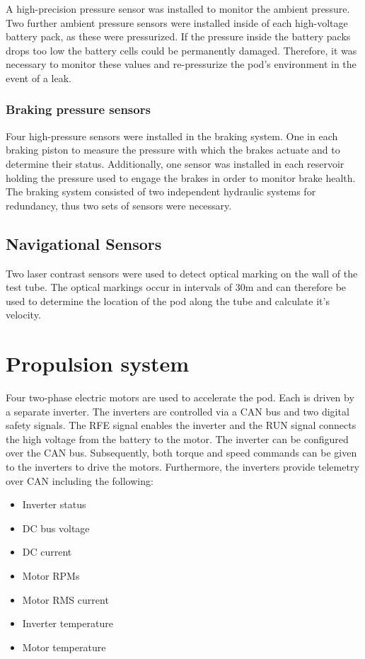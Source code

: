 A high-precision pressure sensor was installed to monitor the ambient pressure. Two further ambient pressure sensors were installed inside of each high-voltage battery pack, as these were pressurized. If the pressure inside the battery packs drops too low the battery cells could be permanently damaged. Therefore, it was necessary to monitor these values and re-pressurize the pod's environment in the event of a leak.

\subsubsection{Braking pressure sensors}

Four high-pressure sensors were installed in the braking system. One in each braking piston to measure the pressure with which the brakes actuate and to determine their status. Additionally, one sensor was installed in each reservoir holding the pressure used to engage the brakes in order to monitor brake health. The braking system consisted of two independent hydraulic systems for redundancy, thus two sets of sensors were necessary.

\subsection{Navigational Sensors}

Two laser contrast sensors were used to detect optical marking on the wall of the test tube. The optical markings occur in intervals of 30m and can therefore be used to determine the location of the pod along the tube and calculate it's velocity.

\section{Propulsion system}

Four two-phase electric motors are used to accelerate the pod. Each is driven by a separate inverter. The inverters are controlled via a CAN bus and two digital safety signals. The RFE signal enables the inverter and the RUN signal connects the high voltage from the battery to the motor. The inverter can be configured over the CAN bus. Subsequently, both torque and speed commands can be given to the inverters to drive the motors. Furthermore, the inverters provide telemetry over CAN including the following:

\begin{itemize}
    \item Inverter status
    \item DC bus voltage
    \item DC current
    \item Motor RPMs
    \item Motor RMS current
    \item Inverter temperature
    \item Motor temperature
\end{itemize}

